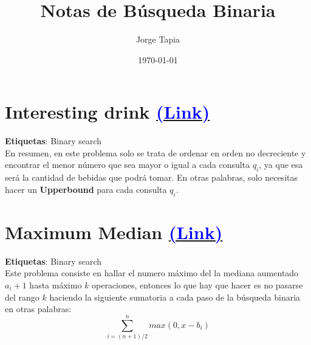 \documentclass{article}
\title{Notas de Búsqueda Binaria}
\author{Jorge Tapia}
\date{\today}
\begin{document}
\maketitle
\section{Interesting drink \href{https://codeforces.com/contest/705/problem/B}{\textcolor{blue}{(Link)}}}
\textbf{Etiquetas}: Binary search \\
En resumen, en este problema solo se trata de ordenar en orden no decreciente y encontrar el menor número que sea mayor o 
igual a cada consulta \( q_i \), ya que esa será la cantidad de bebidas que podrá tomar.
En otras palabras, solo necesitas hacer un \textbf{Upperbound} para cada consulta \( q_i \).
\section{Maximum Median \href{https://codeforces.com/contest/1201/problem/C}{\textcolor{blue}{(Link)}}}
\textbf{Etiquetas}: Binary search \\
Este problema consiste en hallar el numero máximo del la mediana aumentado \(a_i + 1\) hasta máximo $k$ operaciones, entonces lo que hay que hacer es no pasarse del rango $k$ haciendo la siguiente sumatoria a cada paso de la búsqueda binaria en otras palabras:
    \begin{equation*}
        \sum_{i=(n+1)/2}^{n} max(0,x-b_i)
    \end{equation*}
    
\end{document}
